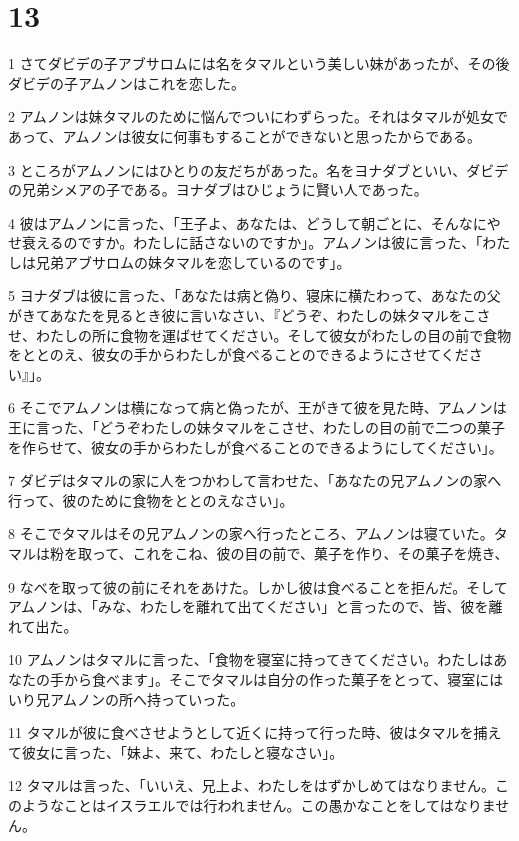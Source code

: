\chapter{13}

\par 1 さてダビデの子アブサロムには名をタマルという美しい妹があったが、その後ダビデの子アムノンはこれを恋した。
\par 2 アムノンは妹タマルのために悩んでついにわずらった。それはタマルが処女であって、アムノンは彼女に何事もすることができないと思ったからである。
\par 3 ところがアムノンにはひとりの友だちがあった。名をヨナダブといい、ダビデの兄弟シメアの子である。ヨナダブはひじょうに賢い人であった。
\par 4 彼はアムノンに言った、「王子よ、あなたは、どうして朝ごとに、そんなにやせ衰えるのですか。わたしに話さないのですか」。アムノンは彼に言った、「わたしは兄弟アブサロムの妹タマルを恋しているのです」。
\par 5 ヨナダブは彼に言った、「あなたは病と偽り、寝床に横たわって、あなたの父がきてあなたを見るとき彼に言いなさい、『どうぞ、わたしの妹タマルをこさせ、わたしの所に食物を運ばせてください。そして彼女がわたしの目の前で食物をととのえ、彼女の手からわたしが食べることのできるようにさせてください』」。
\par 6 そこでアムノンは横になって病と偽ったが、王がきて彼を見た時、アムノンは王に言った、「どうぞわたしの妹タマルをこさせ、わたしの目の前で二つの菓子を作らせて、彼女の手からわたしが食べることのできるようにしてください」。
\par 7 ダビデはタマルの家に人をつかわして言わせた、「あなたの兄アムノンの家へ行って、彼のために食物をととのえなさい」。
\par 8 そこでタマルはその兄アムノンの家へ行ったところ、アムノンは寝ていた。タマルは粉を取って、これをこね、彼の目の前で、菓子を作り、その菓子を焼き、
\par 9 なべを取って彼の前にそれをあけた。しかし彼は食べることを拒んだ。そしてアムノンは、「みな、わたしを離れて出てください」と言ったので、皆、彼を離れて出た。
\par 10 アムノンはタマルに言った、「食物を寝室に持ってきてください。わたしはあなたの手から食べます」。そこでタマルは自分の作った菓子をとって、寝室にはいり兄アムノンの所へ持っていった。
\par 11 タマルが彼に食べさせようとして近くに持って行った時、彼はタマルを捕えて彼女に言った、「妹よ、来て、わたしと寝なさい」。
\par 12 タマルは言った、「いいえ、兄上よ、わたしをはずかしめてはなりません。このようなことはイスラエルでは行われません。この愚かなことをしてはなりません。
